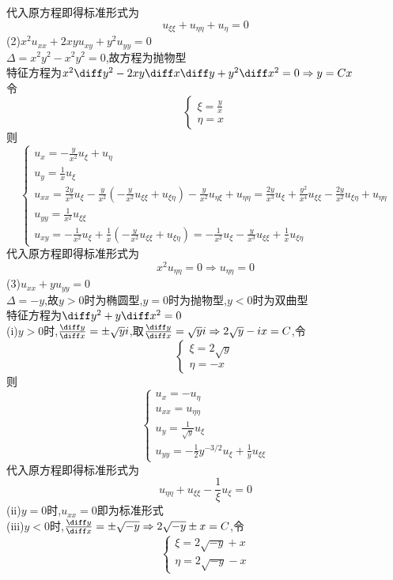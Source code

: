 代入原方程即得标准形式为
\[u_{\xi\xi}+u_{\eta\eta}+u_{\eta}=0\]
(2)$x^2u_{xx}+2xyu_{xy}+y^2u_{yy}=0$\\
$\Delta=x^2y^2-x^2y^2=0$,故方程为抛物型\\
特征方程为$x^2\diff y^2-2xy\diff x\diff y+y^2\diff x^2=0\Rightarrow y=Cx$\\
令\[\begin{cases}
\xi=\frac{y}{x}\\\eta=x
\end{cases}\]
则\[\begin{cases}
u_x=-\frac{y}{x^2}u_{\xi}+u_{\eta}\\
u_y=\frac{1}{x}u_{\xi}\\
u_{xx}=\frac{2y}{x^3}u_{\xi}-\frac{y}{x^2}\left(-\frac{y}{x^2}u_{\xi\xi}+u_{\xi\eta}\right)-\frac{y}{x^2}u_{\eta\xi}+u_{\eta\eta}=\frac{2y}{x^3}u_{\xi}+\frac{y^2}{x^4}u_{\xi\xi}-\frac{2y}{x^2}u_{\xi\eta}+u_{\eta\eta}\\
u_{yy}=\frac{1}{x^2}u_{\xi\xi}\\
u_{xy}=-\frac{1}{x^2}u_{\xi}+\frac{1}{x}\left(-\frac{y}{x^2}u_{\xi\xi}+u_{\xi\eta}\right)=-\frac{1}{x^2}u_{\xi}-\frac{y}{x^3}u_{\xi\xi}+\frac{1}{x}u_{\xi\eta}
\end{cases}\]
代入原方程即得标准形式为
\[x^2u_{\eta\eta}=0\Rightarrow u_{\eta\eta}=0\]
(3)$u_{xx}+yu_{yy}=0$\\
$\Delta=-y$,故$y>0$时为椭圆型,$y=0$时为抛物型,$y<0$时为双曲型\\
特征方程为$\diff y^2+y\diff x^2=0$\\
(i)$y>0$时,$\frac{\diff y}{\diff x}=\pm\sqrt{y}i$,取$\frac{\diff y}{\diff x}=\sqrt{y}i\Rightarrow 2\sqrt{y}-ix=C$,令
\[\begin{cases}
\xi=2\sqrt{y}\\\eta=-x
\end{cases}\]
则\[\begin{cases}
u_x=-u_{\eta}\\
u_{xx}=u_{\eta\eta}\\
u_{y}=\frac{1}{\sqrt{y}}u_{\xi}\\
u_{yy}=-\frac{1}{2}y^{-3/2}u_{\xi}+\frac{1}{y}u_{\xi\xi}
\end{cases}\]
代入原方程即得标准形式为
\[u_{\eta\eta}+u_{\xi\xi}-\frac{1}{\xi}u_{\xi}=0\]
(ii)$y=0$时,$u_{xx}=0$即为标准形式\\
(iii)$y<0$时,$\frac{\diff y}{\diff x}=\pm\sqrt{-y}\Rightarrow 2\sqrt{-y}\pm x=C$,令
\[\begin{cases}
\xi=2\sqrt{-y}+x\\\eta=2\sqrt{-y}-x
\end{cases}\]
